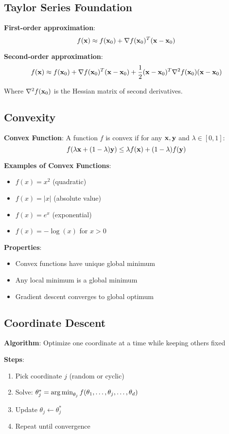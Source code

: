 \documentclass{article}
\begin{document}
\subsection{Taylor Series Foundation}

\textbf{First-order approximation}:
$$f(\mathbf{x}) \approx f(\mathbf{x}_0) + \nabla f(\mathbf{x}_0)^T(\mathbf{x} - \mathbf{x}_0)$$

\textbf{Second-order approximation}:
$$f(\mathbf{x}) \approx f(\mathbf{x}_0) + \nabla f(\mathbf{x}_0)^T(\mathbf{x} - \mathbf{x}_0) + \frac{1}{2}(\mathbf{x} - \mathbf{x}_0)^T\nabla^2 f(\mathbf{x}_0)(\mathbf{x} - \mathbf{x}_0)$$

Where $\nabla^2 f(\mathbf{x}_0)$ is the Hessian matrix of second derivatives.

\subsection{Convexity}

\textbf{Convex Function}: A function $f$ is convex if for any $\mathbf{x}, \mathbf{y}$ and $\lambda \in [0,1]$:
$$f(\lambda \mathbf{x} + (1-\lambda) \mathbf{y}) \leq \lambda f(\mathbf{x}) + (1-\lambda) f(\mathbf{y})$$

\textbf{Examples of Convex Functions}:
\begin{itemize}
    \item $f(x) = x^2$ (quadratic)
    \item $f(x) = |x|$ (absolute value)
    \item $f(x) = e^x$ (exponential)
    \item $f(x) = -\log(x)$ for $x > 0$
\end{itemize}

\textbf{Properties}:
\begin{itemize}
    \item Convex functions have unique global minimum
    \item Any local minimum is a global minimum
    \item Gradient descent converges to global optimum
\end{itemize}

\subsection{Coordinate Descent}

\textbf{Algorithm}: Optimize one coordinate at a time while keeping others fixed

\textbf{Steps}:
\begin{enumerate}
    \item Pick coordinate $j$ (random or cyclic)
    \item Solve: $\theta_j^* = \operatorname*{arg\,min}_{\theta_j} f(\theta_1, \ldots, \theta_j, \ldots, \theta_d)$
    \item Update $\theta_j \leftarrow \theta_j^*$
    \item Repeat until convergence
\end{enumerate}
\end{document}
